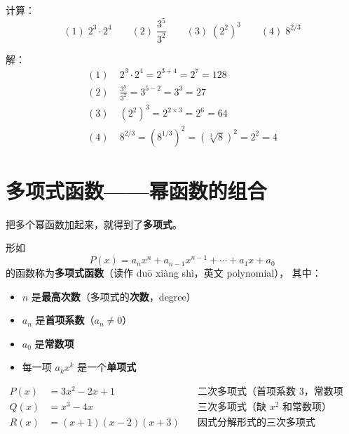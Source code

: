 \begin{examplebox}[6——幂运算练习]
计算：
\[
(1)\; 2^3 \cdot 2^4 \qquad (2)\; \frac{3^5}{3^2} \qquad (3)\; (2^2)^3 \qquad (4)\; 8^{2/3}
\]

解：
\[
\begin{aligned}
(1)&\; 2^3 \cdot 2^4 = 2^{3+4} = 2^7 = 128 \\
(2)&\; \frac{3^5}{3^2} = 3^{5-2} = 3^3 = 27 \\
(3)&\; (2^2)^3 = 2^{2\times3} = 2^6 = 64 \\
(4)&\; 8^{2/3} = (8^{1/3})^2 = (\sqrt[3]{8})^2 = 2^2 = 4
\end{aligned}
\]
\end{examplebox}


\section{多项式函数——幂函数的组合}

把多个幂函数加起来，就得到了\textbf{多项式}。

\begin{definitionbox}[多项式函数]
形如
\[
P(x) = a_n x^n + a_{n-1} x^{n-1} + \cdots + a_1 x + a_0
\]
的函数称为\textbf{多项式函数}（读作 duō xiàng shì，英文 polynomial），
其中：
\begin{itemize}
  \item \(n\) 是\textbf{最高次数}（多项式的\textbf{次数}，degree）
  \item \(a_n\) 是\textbf{首项系数}（\(a_n \neq 0\)）
  \item \(a_0\) 是\textbf{常数项}
  \item 每一项 \(a_k x^k\) 是一个\textbf{单项式}
\end{itemize}
\end{definitionbox}

\begin{examplebox}[7——多项式举例]
\begin{align*}
  P(x) &= 3x^2 - 2x + 1 \quad &\text{二次多项式（首项系数 3，常数项 1）} \\
  Q(x) &= x^3 - 4x \quad &\text{三次多项式（缺 \(x^2\) 和常数项）} \\
  R(x) &= (x+1)(x-2)(x+3) \quad &\text{因式分解形式的三次多项式}
\end{align*}
\end{examplebox}


